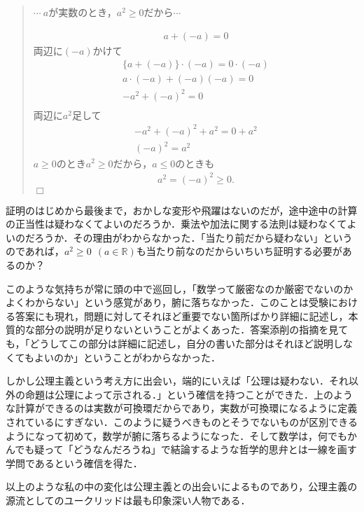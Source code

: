\documentclass[12pt]{jarticle}
\makeatletter
\theoremstyle{break}        %
\newenvironment{proof}[1][\proofname]{\par
  \normalfont
  \topsep6\p@\@plus6\p@ \trivlist
  \item[\hskip\labelsep\bfseries
    #1\@addpunct{}]\ignorespaces
}{%
  \nobreak\hfill\hbox{$\Box$}\endtrivlist
}
\newcommand{\proofname}{証明}
\newcommand{\?}{\textcolor{red}{??}}
\makeatother
\begin{document}
\begin{quote}
    $\cdots ~a$が実数のとき，$a^2 \geq 0$だから$\cdots$

    \begin{proof}
        \begin{align*}
            a + (-a) = 0
        \end{align*}
        両辺に$(-a)$かけて
        \begin{align*}
            \{ a + (-a) \} \cdot (-a) = 0 \cdot (-a)\\
            a \cdot (-a) + (-a)(-a) = 0\\
            -a^2 + (-a)^2 = 0\\
        \end{align*}
        両辺に$a^2$足して
        \begin{align*}
            -a^2 + (-a)^2 + a^2= 0 + a^2\\
            (-a)^2 = a^2
        \end{align*}
        $a \geq 0$のとき$a^2 \geq 0$だから，$a \leq 0$のときも
        \begin{align*}
            a^2 = (-a)^2 \geq 0 .
        \end{align*}
    \end{proof}
\end{quote}
証明のはじめから最後まで，おかしな変形や飛躍はないのだが，途中途中の計算の正当性は疑わなくてよいのだろうか．乗法や加法に関する法則は疑わなくてよいのだろうか．その理由がわからなかった．「当たり前だから疑わない」というのであれば，$a^2\geq 0 ~~ (a \in \mathbb{R})$も当たり前なのだからいちいち証明する必要があるのか？

このような気持ちが常に頭の中で巡回し，「数学って厳密なのか厳密でないのかよくわからない」という感覚があり，腑に落ちなかった．このことは受験における答案にも現れ，問題に対してそれほど重要でない箇所ばかり詳細に記述し，本質的な部分の説明が足りないということがよくあった．答案添削の指摘を見ても，「どうしてこの部分は詳細に記述し，自分の書いた部分はそれほど説明しなくてもよいのか」ということがわからなかった．

しかし公理主義という考え方に出会い，端的にいえば「公理は疑わない．それ以外の命題は公理によって示される．」という確信を持つことができた．上のような計算ができるのは実数が可換環だからであり，実数が可換環になるように定義されているにすぎない．このように疑うべきものとそうでないものが区別できるようになって初めて，数学が腑に落ちるようになった．そして数学は，何でもかんでも疑って「どうなんだろうね」で結論するような哲学的思弁とは一線を画す学問であるという確信を得た．

以上のような私の中の変化は公理主義との出会いによるものであり，公理主義の源流としてのユークリッドは最も印象深い人物である．


\end{document}
